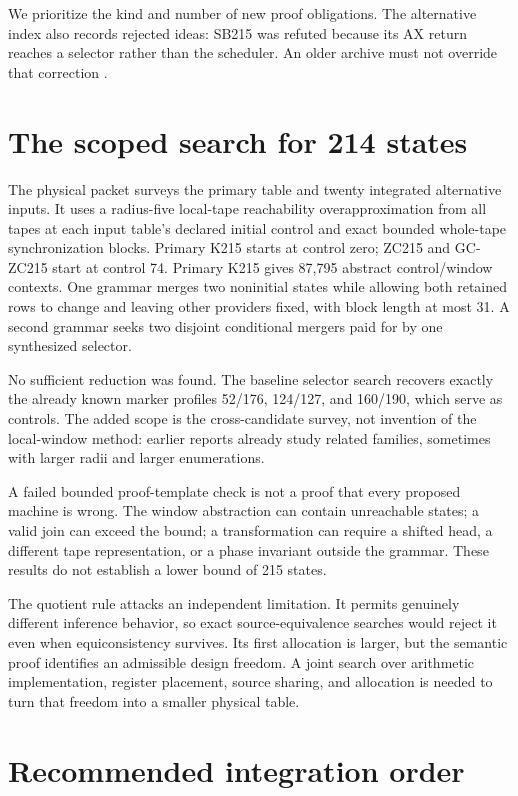 \documentclass[11pt]{article}
\begin{document}
We prioritize the kind and number of new proof obligations. The alternative index also records rejected ideas: SB215 was refuted because its AX return reaches a selector rather than the scheduler. An older archive must not override that correction \cite{alternatives,incoming}.

\section{The scoped search for 214 states}

The physical packet surveys the primary table and twenty integrated alternative inputs. It uses a radius-five local-tape reachability overapproximation from all tapes at each input table's declared initial control and exact bounded whole-tape synchronization blocks. Primary K215 starts at control zero; ZC215 and GC-ZC215 start at control 74. Primary K215 gives 87,795 abstract control/window contexts. One grammar merges two noninitial states while allowing both retained rows to change and leaving other providers fixed, with block length at most 31. A second grammar seeks two disjoint conditional mergers paid for by one synthesized selector.

No sufficient reduction was found. The baseline selector search recovers exactly the already known marker profiles 52/176, 124/127, and 160/190, which serve as controls. The added scope is the cross-candidate survey, not invention of the local-window method: earlier reports already study related families, sometimes with larger radii and larger enumerations.

A failed bounded proof-template check is not a proof that every proposed machine is wrong. The window abstraction can contain unreachable states; a valid join can exceed the bound; a transformation can require a shifted head, a different tape representation, or a phase invariant outside the grammar. These results do not establish a lower bound of 215 states.

The quotient rule attacks an independent limitation. It permits genuinely different inference behavior, so exact source-equivalence searches would reject it even when equiconsistency survives. Its first allocation is larger, but the semantic proof identifies an admissible design freedom. A joint search over arithmetic implementation, register placement, source sharing, and allocation is needed to turn that freedom into a smaller physical table.

\section{Recommended integration order}
\end{document}
